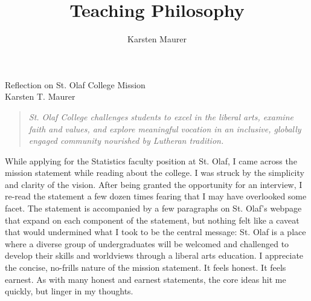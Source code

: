 \documentclass[letterpaper,12pt]{article}\usepackage[]{graphicx}\usepackage[]{color}
\title{Teaching Philosophy}
\author{Karsten Maurer}
\date{}
\begin{document}
\onehalfspacing

\begin{center}
\Large Reflection on St. Olaf College Mission \\
\normalsize Karsten T. Maurer \\
\end{center}

\vspace{.1in}

\begin{quote}
{\it St. Olaf College challenges students to excel in the liberal arts, examine faith and values, and explore meaningful vocation in an inclusive, globally engaged community nourished by Lutheran tradition.}
\end{quote}

While applying for the Statistics faculty position at St. Olaf, I came across the mission statement while reading about the college. I was struck by the simplicity and clarity of the vision. After being granted the opportunity for an interview, I re-read the statement a few dozen times fearing that I may have overlooked some facet. The statement is accompanied by a few paragraphs on St. Olaf's webpage that expand on each component of the statement, but nothing felt like a caveat that would undermined what I took to be the central message: St. Olaf is a place where a diverse group of undergraduates will be welcomed and challenged to develop their skills and worldviews through a liberal arts education. I appreciate the concise, no-frills nature of the mission statement. It feels honest. It feels earnest. As with many honest and earnest statements, the core ideas hit me quickly, but linger in my thoughts.  
\end{document}
